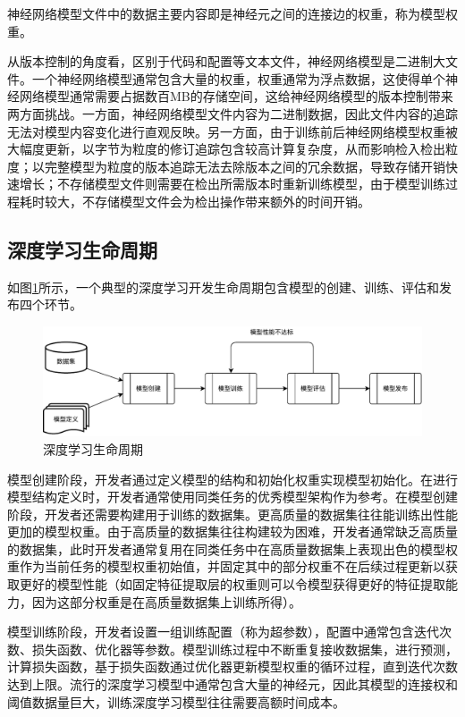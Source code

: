 \documentclass{cjc}
\begin{document}
神经网络模型文件中的数据主要内容即是神经元之间的连接边的权重，称为模型权重。

从版本控制的角度看，区别于代码和配置等文本文件，神经网络模型是二进制大文件。一个神经网络模型通常包含大量的权重，权重通常为浮点数据，这使得单个神经网络模型通常需要占据数百MB的存储空间，这给神经网络模型的版本控制带来两方面挑战。一方面，神经网络模型文件内容为二进制数据，因此文件内容的追踪无法对模型内容变化进行直观反映。另一方面，由于训练前后神经网络模型权重被大幅度更新，以字节为粒度的修订追踪包含较高计算复杂度，从而影响检入检出粒度；以完整模型为粒度的版本追踪无法去除版本之间的冗余数据，导致存储开销快速增长；不存储模型文件则需要在检出所需版本时重新训练模型，由于模型训练过程耗时较大，不存储模型文件会为检出操作带来额外的时间开销。

\subsection{深度学习生命周期}
如图\ref{lifecycle}所示，一个典型的深度学习开发生命周期包含模型的创建、训练、评估和发布四个环节。

\begin{figure}[htb]
  \centering
  \includegraphics[width=\linewidth]{lifecycle.pdf}
  \caption{深度学习生命周期}
  \label{lifecycle}
\end{figure}

模型创建阶段，开发者通过定义模型的结构和初始化权重实现模型初始化。在进行模型结构定义时，开发者通常使用同类任务的优秀模型架构作为参考。在模型创建阶段，开发者还需要构建用于训练的数据集。更高质量的数据集往往能训练出性能更加的模型权重。由于高质量的数据集往往构建较为困难，开发者通常缺乏高质量的数据集，此时开发者通常复用在同类任务中在高质量数据集上表现出色的模型权重作为当前任务的模型权重初始值，并固定其中的部分权重不在后续过程更新以获取更好的模型性能（如固定特征提取层的权重则可以令模型获得更好的特征提取能力，因为这部分权重是在高质量数据集上训练所得）。

模型训练阶段，开发者设置一组训练配置（称为超参数），配置中通常包含迭代次数、损失函数、优化器等参数。模型训练过程中不断重复接收数据集，进行预测，计算损失函数，基于损失函数通过优化器更新模型权重的循环过程，直到迭代次数达到上限。流行的深度学习模型中通常包含大量的神经元，因此其模型的连接权和阈值数据量巨大，训练深度学习模型往往需要高额时间成本。
\end{document}
